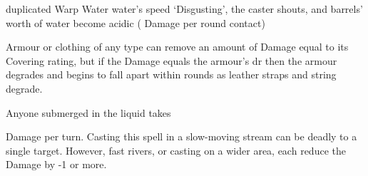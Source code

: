   {duplicated}%
  {Warp}%
  {Water}%
  {water's speed}%
  {`Disgusting', the caster shouts, and  barrels' worth of water become acidic ( Damage per round contact)}%
  {
    Armour or clothing of any type can remove an amount of Damage equal to its Covering rating, but if the Damage equals the armour's \gls{dr} then the armour degrades and begins to fall apart within  rounds as leather straps and string degrade.

    Anyone submerged in the liquid takes \addtocounter{spellCost}{2}  Damage per turn.
    Casting this spell in a slow-moving stream can be deadly to a single target.
    However, fast rivers, or casting on a wider area, each reduce the Damage by -1 or more.
  }

